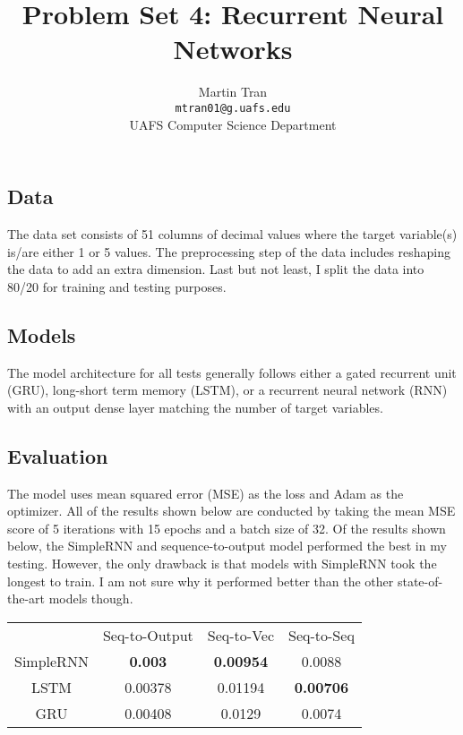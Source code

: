 \documentclass[letterpaper]{article}
\title{Problem Set 4: Recurrent Neural Networks}
\author{Martin Tran \\[1em]         \texttt{mtran01@g.uafs.edu}    \vspace{1em} \\
UAFS Computer Science Department}
\begin{document}
\maketitle

\subsection*{Data}

The data set consists of 51 columns of decimal values where the target variable(s) is/are either 1 or 5 values. The preprocessing step of the data includes reshaping the data to add an extra dimension. Last but not least, I split the data into 80/20 for training and testing purposes. 

\subsection*{Models}

The model architecture for all tests generally follows either a gated recurrent unit (GRU), long-short term memory (LSTM), or a recurrent neural network (RNN) with an output dense layer matching the number of target variables. 

\subsection*{Evaluation}


The model uses mean squared error (MSE) as the loss and Adam as the optimizer. All of the results shown below are conducted by taking the mean MSE score of 5 iterations with 15 epochs and a batch size of 32. Of the results shown below, the SimpleRNN and sequence-to-output model performed the best in my testing. However, the only drawback is that models with SimpleRNN took the longest to train. I am not sure why it performed better than the other state-of-the-art models though. 

\vspace{5mm}
\centering
\begin{tabular}{cccc}
          & Seq-to-Output  & Seq-to-Vec       & Seq-to-Seq       \\
SimpleRNN & \textbf{0.003} & \textbf{0.00954} & 0.0088           \\
LSTM      & 0.00378        & 0.01194          & \textbf{0.00706} \\
GRU       & 0.00408        & 0.0129           & 0.0074          
\end{tabular}
\end{document}
